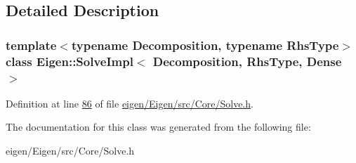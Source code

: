 \subsection{Detailed Description}
\subsubsection*{template$<$typename Decomposition, typename Rhs\+Type$>$\newline
class Eigen\+::\+Solve\+Impl$<$ Decomposition, Rhs\+Type, Dense $>$}



Definition at line \hyperlink{eigen_2_eigen_2src_2_core_2_solve_8h_source_l00086}{86} of file \hyperlink{eigen_2_eigen_2src_2_core_2_solve_8h_source}{eigen/\+Eigen/src/\+Core/\+Solve.\+h}.



The documentation for this class was generated from the following file\+:\begin{DoxyCompactItemize}
\item 
eigen/\+Eigen/src/\+Core/\+Solve.\+h\end{DoxyCompactItemize}
